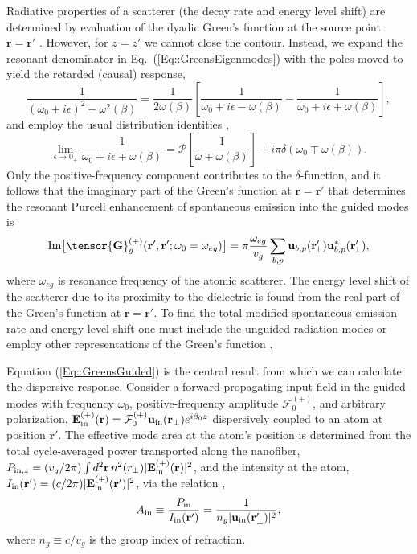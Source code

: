 \documentclass[preprint, aps,pra,onecolumn]{revtex4-1} %
\def\br{\mathbf{r}}
\newcommand{\erf}[1]{Eq.~(\ref{#1})}
\newcommand{\mbf}[1]{\mathbf{#1}}
\newcommand{\inp}{{\rm in}}
\newcommand{\Eamp}{\mathcal{F}_0^{(+)}}
\begin{document}
Radiative properties of a scatterer (the decay rate and energy level shift) are determined by evaluation of the dyadic Green's function at the source point $\mbf{r} = \mbf{r}'$ \cite{fussell_decay_2005}.  However, for $z=z'$ we cannot close the contour. Instead, we expand the resonant denominator in \erf{Eq::GreensEigenmodes} with the poles moved to yield the retarded (causal) response,
\begin{equation}
\frac{1}{(\omega_0+i\epsilon)^2-\omega^2(\beta)}=\frac{1}{2 \omega(\beta)}\left[ \frac{1}{\omega_0+ i 
\epsilon - \omega(\beta)} - \frac{1}{\omega_0+ i \epsilon + \omega(\beta)} \right],
\end{equation}
 and employ the usual distribution identities \cite{sondergaard_general_2001},
\begin{equation}
\lim_{\epsilon \rightarrow 0_+} \frac{1}{\omega_0 + i \epsilon \mp 
\omega(\beta)}=\mathcal{P}\left[\frac{1}{\omega \mp \omega(\beta)} \right] + i \pi \delta (\omega_0 \mp 
\omega(\beta)).
\end{equation}
Only the positive-frequency component contributes to the $\delta$-function, and it follows that the imaginary part of the Green's function at $\br = \br'$ that determines the resonant Purcell enhancement of spontaneous emission into the guided modes is \cite{dung_spontaneous_2000, fussell_decay_2005, chen_finite-element_2010}
	\begin{equation}\label{Eq::ImGreenLocal}
		{\rm Im} \big[\tensor{\mathbf{G}}^{(+)}_g(\br',\br'; \omega_0=\omega_{eg}) \big] = \pi \frac{\omega_{eg}}{v_g } \sum_{b, p} 
		\mathbf{u}_{b, p} (\br_{\!\perp}^\prime)\mathbf{u}^*_{b , p} (\br_{\!\perp}^\prime),
	\end{equation}
where $\omega_{eg}$ is resonance frequency of the atomic scatterer.  The energy level shift of the scatterer due to its proximity to the dielectric is found from the real part of the Green's function at $\br = \br'$. 
To find the total modified spontaneous emission rate and energy level shift one must include the unguided radiation modes \cite{le_kien_spontaneous_2005} or employ other representations of the Green's function \cite{klimov_spontaneous_2004}.  

Equation (\ref{Eq::GreensGuided}) is the central result from which we can calculate the dispersive response.  Consider a forward-propagating input field in the guided modes with frequency $\omega_0$, positive-frequency amplitude $\Eamp$, and arbitrary polarization, $\mathbf{E}^{(+)}_{\inp}(\br) = \Eamp  \mathbf{u}_{\rm in}(\br_\perp) e^{i \beta_0 z}$ dispersively coupled to an atom at position $\mathbf{r}'$.  The effective mode area at the atom's position is determined from the total cycle-averaged power transported along the nanofiber, $P_{{\rm in},z} = (v_g/2\pi) \int d^2\br \, n^2(r_\perp) |\mathbf{E}^{(+)}_{\inp}(\br) |^2$, and the intensity at the atom, $I_{\rm in}(\mathbf{r}') = (c/2\pi) |\mathbf{E}^{(+)}_{\inp}(\br') |^2$, via the relation \cite{domokos_quantum_2002},
 	\begin{align} \label{Eq::AreaIn}
 		A_{\rm in} \equiv \frac{P_{{\rm in}}}{I_{\rm in}(\mathbf{r}')} = \frac{1}{n_g |\mathbf{u}_{\rm in}(\mathbf{r}'_\perp)|^{2}},
	\end{align}
where $n_g\equiv c/v_g$ is the group index of refraction.    
\end{document}
